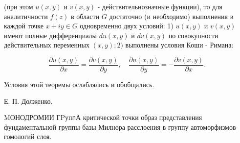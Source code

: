 \documentclass[10pt]{article}
\begin{document}
(при этом $u(x, y)$ и $v(x, y)$ - действительнозначные функции), то для аналитичности $f(z)$ в области $G$ достаточно (и необходимо) выполнения в каждой точке $x+i y \in G$ одновременно двух условий: 1) $u(x, y)$ и $v(x, y)$ имеют полные дифференциалы $d u(x, y)$ и $d v(x, y)$ по совокупности действительных переменных $(x, y) ; 2)$ выполнены условия Коши - Римана:



\[

\frac{\partial u(x, y)}{\partial x}=\frac{\partial v(x, y)}{\partial y}, \quad \frac{\partial u(x, y)}{\partial y}=-\frac{\partial v(x, y)}{\partial x} .

\]



Условия этой теоремы ослаблялись и обобщались.



Е. П. Долженко.



MОНОДРОМИИ ГPупกА критической точки образ представления фундаментальной группы базы Милнора расслоения в группу автоморфизмов гомологий слоя.
\end{document}
